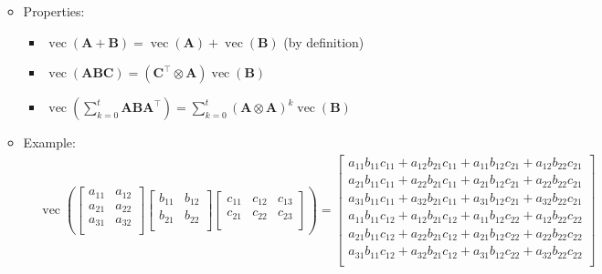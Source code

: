 \documentclass[12pt,a4paper]{article}
\DeclareMathOperator{\vect}{vec}
\begin{document}
\begin{itemize}
\begin{itemize}
\begin{equation}
    \end{equation}
  \item Properties:
    \begin{itemize}
    \item $\vect(\bm{A} + \bm{B}) = \vect(\bm{A}) + \vect(\bm{B})$ (by definition)
    \item $\vect(\bm{A}\bm{B}\bm{C}) = (\bm{C}^{\top}\otimes \bm{A})\vect(\bm{B})$ %
    \item $\vect(\sum_{k=0}^{t}\bm{A}\bm{B}\bm{A}^{\top}) = \sum_{k=0}^{t}(\bm{A}\otimes \bm{A})^{k}\vect(\bm{B})$ %
    \end{itemize}
  \item Example:
    \begin{align}
      & \vect \left(
        \begin{bmatrix}
          a_{11} & a_{12} \\
          a_{21} & a_{22} \\
          a_{31} & a_{32} \\
        \end{bmatrix}
        \begin{bmatrix}
          b_{11} & b_{12} \\
          b_{21} & b_{22} \\
        \end{bmatrix}
        \begin{bmatrix}
          c_{11} & c_{12} & c_{13} \\
          c_{21} & c_{22} & c_{23}\\
        \end{bmatrix}
        \right)
     = 
     \begin{bmatrix}
        a_{11}b_{11}c_{11} + a_{12}b_{21}c_{11} + a_{11}b_{12}c_{21} + a_{12}b_{22}c_{21} \\
        a_{21}b_{11}c_{11} + a_{22}b_{21}c_{11} + a_{21}b_{12}c_{21} + a_{22}b_{22}c_{21} \\
        a_{31}b_{11}c_{11} + a_{32}b_{21}c_{11} + a_{31}b_{12}c_{21} + a_{32}b_{22}c_{21} \\
        a_{11}b_{11}c_{12} + a_{12}b_{21}c_{12} + a_{11}b_{12}c_{22} + a_{12}b_{22}c_{22} \\
        a_{21}b_{11}c_{12} + a_{22}b_{21}c_{12} + a_{21}b_{12}c_{22} + a_{22}b_{22}c_{22} \\
        a_{31}b_{11}c_{12} + a_{32}b_{21}c_{12} + a_{31}b_{12}c_{22} + a_{32}b_{22}c_{22} \\

\end{bmatrix}
\end{align}
\end{itemize}
\end{itemize}
\end{document}
